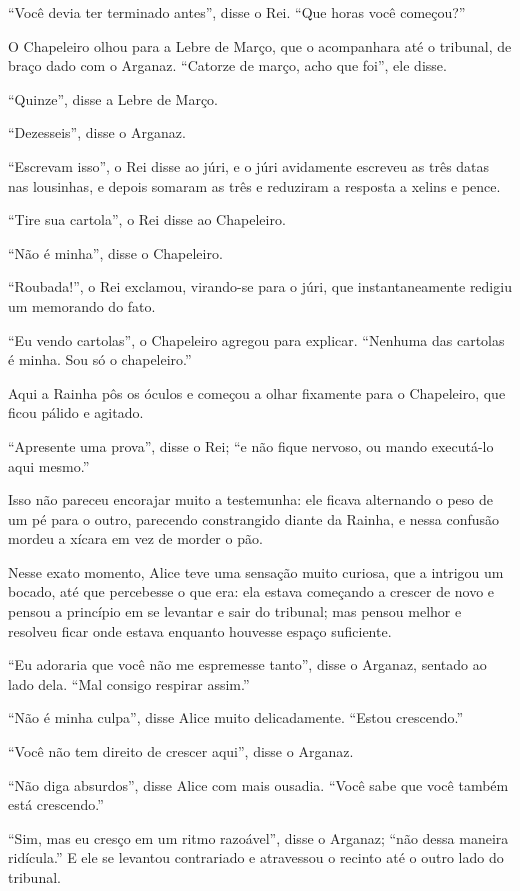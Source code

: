 ``Você devia ter terminado antes'', disse o Rei. ``Que horas você
começou?''

O Chapeleiro olhou para a Lebre de Março, que o acompanhara até o
tribunal, de braço dado com o Arganaz. ``Catorze de março, acho que
foi'', ele disse.

``Quinze'', disse a Lebre de Março.

``Dezesseis'', disse o Arganaz.

``Escrevam isso'', o Rei disse ao júri, e o júri avidamente escreveu as
três datas nas lousinhas, e depois somaram as três e reduziram a
resposta a xelins e pence.

``Tire sua cartola'', o Rei disse ao Chapeleiro.

``Não é minha'', disse o Chapeleiro.

``Roubada!'', o Rei exclamou, virando-se para o júri, que
instantaneamente redigiu um memorando do fato.

``Eu vendo cartolas'', o Chapeleiro agregou para explicar. ``Nenhuma das
cartolas é minha. Sou só o chapeleiro.''

Aqui a Rainha pôs os óculos e começou a olhar fixamente para o
Chapeleiro, que ficou pálido e agitado.

``Apresente uma prova'', disse o Rei; ``e não fique nervoso, ou mando
executá-lo aqui mesmo.''

Isso não pareceu encorajar muito a testemunha: ele ficava alternando o
peso de um pé para o outro, parecendo constrangido diante da Rainha, e
nessa confusão mordeu a xícara em vez de morder o pão.

Nesse exato momento, Alice teve uma sensação muito curiosa, que a
intrigou um bocado, até que percebesse o que era: ela estava começando a
crescer de novo e pensou a princípio em se levantar e sair do tribunal;
mas pensou melhor e resolveu ficar onde estava enquanto houvesse espaço
suficiente.

``Eu adoraria que você não me espremesse tanto'', disse o Arganaz,
sentado ao lado dela. ``Mal consigo respirar assim.''

``Não é minha culpa'', disse Alice muito delicadamente. ``Estou
crescendo.''

``Você não tem direito de crescer aqui'', disse o Arganaz.

``Não diga absurdos'', disse Alice com mais ousadia. ``Você sabe que
você também está crescendo.''

``Sim, mas eu cresço em um ritmo razoável'', disse o Arganaz; ``não
dessa maneira ridícula.'' E ele se levantou contrariado e atravessou o
recinto até o outro lado do tribunal.

